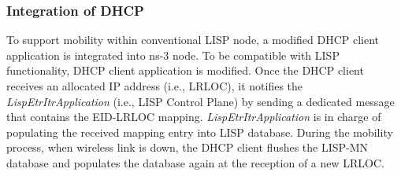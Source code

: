 \subsubsection{Integration of DHCP}\label{subsec:DHCP}
To support mobility within conventional LISP node, a modified DHCP client
application is integrated into ns-3 node. To be compatible with LISP
functionality, DHCP client application is modified. Once the DHCP client
receives an allocated IP address (i.e., LRLOC), it notifies the
\emph{LispEtrItrApplication} (i.e., LISP Control Plane) by sending a dedicated
message that contains the EID-LRLOC mapping. \emph{LispEtrItrApplication} is in
charge of populating the received mapping entry into LISP database. During the
mobility process, when wireless link is down, the DHCP client flushes the
LISP-MN database and populates the database again at the reception of a new
LRLOC.
